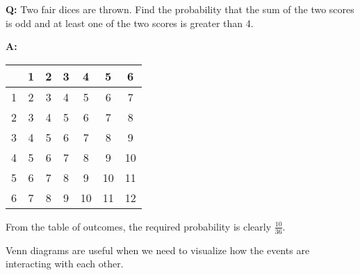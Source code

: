 \begin{example}
    \phantom{.}
    
    \textbf{Q:} Two fair dices are thrown. Find the probability that the sum of the two scores is odd and at least one of the two scores is greater than 4.

    \textbf{A:}
    \begin{center}
        \begin{tabular}{|c|c|c|c|c|c|c|}
            \hline  & 1 & 2 & 3 & 4 & 5 & 6\\\hline
            1 & 2 & 3 & 4 & 5 & 6 & \cellcolor{ForestGreen!20}7 \\ \hline
            2 & 3 & 4 & 5 & 6 & \cellcolor{ForestGreen!20}7 & 8 \\ \hline
            3 & 4 & 5 & 6 & 7 & 8 & \cellcolor{ForestGreen!20}9 \\ \hline
            4 & 5 & 6 & 7 & 8 & \cellcolor{ForestGreen!20}9 & 10 \\ \hline
            5 & 6 & \cellcolor{ForestGreen!20}7 & 8 & \cellcolor{ForestGreen!20}9 & 10 & \cellcolor{ForestGreen!20}11 \\ \hline
            6 & \cellcolor{ForestGreen!20}7 & 8 & \cellcolor{ForestGreen!20}9 & 10 & \cellcolor{ForestGreen!20}11 & 12 \\ \hline
          \end{tabular}
    \end{center}
    From the table of outcomes, the required probability is clearly $\frac{10}{36}$.
\end{example}

\begin{method}
    Venn diagrams are useful when we need to visualize how the events are interacting with each other.
\end{method}

